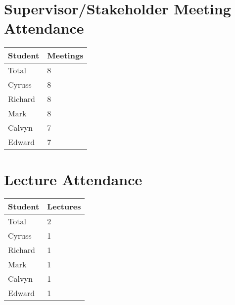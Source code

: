 \documentclass{article}
\begin{document}

\section{Supervisor/Stakeholder Meeting Attendance}


\begin{table}[H]
\centering
\begin{tabular}{ll}
\toprule
\textbf{Student} & \textbf{Meetings}\\
\midrule
Total & 8\\
Cyruss & 8\\
Richard & 8\\
Mark & 8\\
Calvyn & 7\\
Edward & 7\\
\bottomrule
\end{tabular}
\end{table}


\section{Lecture Attendance}


\begin{table}[H]
\centering
\begin{tabular}{ll}
\toprule
\textbf{Student} & \textbf{Lectures}\\
\midrule
Total & 2\\
Cyruss & 1\\
Richard & 1\\
Mark & 1\\
Calvyn & 1\\
Edward & 1\\
\bottomrule
\end{tabular}
\end{table}
\end{document}
